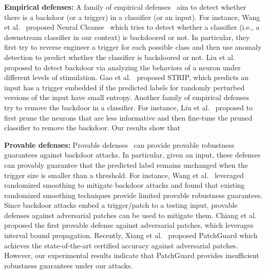 \noindent
{\bf Empirical defenses:} A family of empirical defenses~\cite{tran2018spectral,wang2019neural,xu2019detecting,gao2019strip,liu2019abs,doan2020februus} 
aim to detect whether there is a backdoor (or a trigger) in a classifier (or an input). For instance, Wang et al.~\cite{wang2019neural} proposed Neural Cleanse~\cite{wang2019neural} which tries to detect whether a classifier (i.e., a downstream classifier in our context) is backdoored or not. In particular, they first try to reverse engineer a trigger for each possible class  and then use anomaly detection to predict whether the classifier is backdoored or not. Liu et al.~\cite{liu2019abs} proposed to detect  backdoor via analyzing the behaviors of a neuron under different levels of stimulation. Gao et al.~\cite{gao2019strip} proposed STRIP, which predicts an  input has a  trigger embedded if the predicted labels for randomly perturbed versions of the input have small entropy. 
Another family of empirical defenses~\cite{liu2018fine,wang2019neural} try to remove the backdoor in a classifier. For instance, Liu et al.~\cite{liu2018fine} proposed to first prune the neurons that are less informative and then fine-tune the pruned classifier to remove the backdoor. Our results show that  



\noindent
{\bf Provable defenses:} Provable defenses~\cite{wang2020certifying,weber2020rab,zhang2020backdoor,metzen2021efficient,chiang2019certified,levine2020randomized,xiang2020patchguard,jia2020certified,jia2021intrinsic} can provide provable robustness guarantees against backdoor attacks. In particular, given an input, these defenses can provably guarantee that the predicted label remains unchanged when the trigger size is smaller than a threshold. For instance, Wang et al.~\cite{wang2020certifying} leveraged randomized smoothing to mitigate backdoor attacks and found that existing randomized smoothing techniques provide limited provable robustness guarantees.
Since backdoor attacks embed a trigger/patch to a testing input, provable defenses against adversarial patches can be used to mitigate them.
Chiang et al.~\cite{chiang2019certified} proposed the first provable defense against adversarial patches, which leverages interval bound propagation. 
Recently, Xiang et al.~\cite{xiang2020patchguard} proposed PatchGuard which achieves the state-of-the-art certified accuracy against adversarial patches. However, our experimental results indicate that PatchGuard provides insufficient  robustness guarantees under our attacks. 